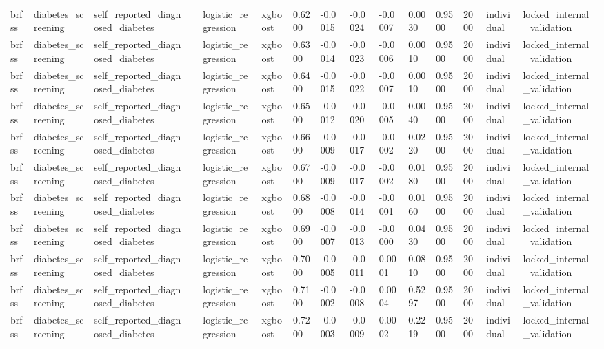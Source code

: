 \begin{tabular}{lllllllllllllll}
brfss & diabetes\_screening & self\_reported\_diagnosed\_diabetes &  & logistic\_regression & xgboost & 0.6200 & -0.0015 & -0.0024 & -0.0007 & 0.0030 & 0.9500 & 2000 & individual & locked\_internal\_validation \\
brfss & diabetes\_screening & self\_reported\_diagnosed\_diabetes &  & logistic\_regression & xgboost & 0.6300 & -0.0014 & -0.0023 & -0.0006 & 0.0010 & 0.9500 & 2000 & individual & locked\_internal\_validation \\
brfss & diabetes\_screening & self\_reported\_diagnosed\_diabetes &  & logistic\_regression & xgboost & 0.6400 & -0.0015 & -0.0022 & -0.0007 & 0.0010 & 0.9500 & 2000 & individual & locked\_internal\_validation \\
brfss & diabetes\_screening & self\_reported\_diagnosed\_diabetes &  & logistic\_regression & xgboost & 0.6500 & -0.0012 & -0.0020 & -0.0005 & 0.0040 & 0.9500 & 2000 & individual & locked\_internal\_validation \\
brfss & diabetes\_screening & self\_reported\_diagnosed\_diabetes &  & logistic\_regression & xgboost & 0.6600 & -0.0009 & -0.0017 & -0.0002 & 0.0220 & 0.9500 & 2000 & individual & locked\_internal\_validation \\
brfss & diabetes\_screening & self\_reported\_diagnosed\_diabetes &  & logistic\_regression & xgboost & 0.6700 & -0.0009 & -0.0017 & -0.0002 & 0.0180 & 0.9500 & 2000 & individual & locked\_internal\_validation \\
brfss & diabetes\_screening & self\_reported\_diagnosed\_diabetes &  & logistic\_regression & xgboost & 0.6800 & -0.0008 & -0.0014 & -0.0001 & 0.0160 & 0.9500 & 2000 & individual & locked\_internal\_validation \\
brfss & diabetes\_screening & self\_reported\_diagnosed\_diabetes &  & logistic\_regression & xgboost & 0.6900 & -0.0007 & -0.0013 & -0.0000 & 0.0430 & 0.9500 & 2000 & individual & locked\_internal\_validation \\
brfss & diabetes\_screening & self\_reported\_diagnosed\_diabetes &  & logistic\_regression & xgboost & 0.7000 & -0.0005 & -0.0011 & 0.0001 & 0.0810 & 0.9500 & 2000 & individual & locked\_internal\_validation \\
brfss & diabetes\_screening & self\_reported\_diagnosed\_diabetes &  & logistic\_regression & xgboost & 0.7100 & -0.0002 & -0.0008 & 0.0004 & 0.5297 & 0.9500 & 2000 & individual & locked\_internal\_validation \\
brfss & diabetes\_screening & self\_reported\_diagnosed\_diabetes &  & logistic\_regression & xgboost & 0.7200 & -0.0003 & -0.0009 & 0.0002 & 0.2219 & 0.9500 & 2000 & individual & locked\_internal\_validation \\

\end{tabular}
